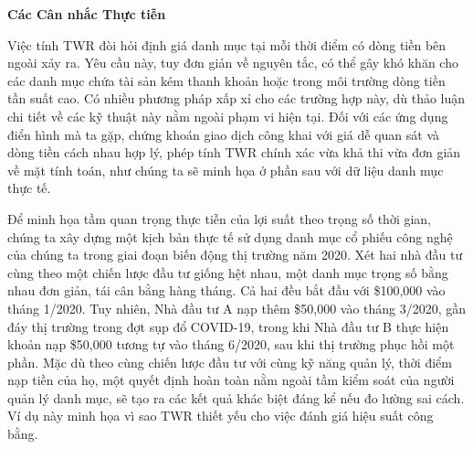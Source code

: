 \textbf{Các Cân nhắc Thực tiễn}

Việc tính TWR đòi hỏi định giá danh mục tại mỗi thời điểm có dòng tiền bên ngoài xảy ra. Yêu cầu này, tuy đơn giản về nguyên tắc, có thể gây khó khăn cho các danh mục chứa tài sản kém thanh khoản hoặc trong môi trường dòng tiền tần suất cao. Có nhiều phương pháp xấp xỉ cho các trường hợp này, dù thảo luận chi tiết về các kỹ thuật này nằm ngoài phạm vi hiện tại. Đối với các ứng dụng điển hình mà ta gặp, chứng khoán giao dịch công khai với giá dễ quan sát và dòng tiền cách nhau hợp lý, phép tính TWR chính xác vừa khả thi vừa đơn giản về mặt tính toán, như chúng ta sẽ minh họa ở phần sau với dữ liệu danh mục thực tế.

Để minh họa tầm quan trọng thực tiễn của lợi suất theo trọng số thời gian, chúng ta xây dựng một kịch bản thực tế sử dụng danh mục cổ phiếu công nghệ của chúng ta trong giai đoạn biến động thị trường năm 2020. Xét hai nhà đầu tư cùng theo một chiến lược đầu tư giống hệt nhau, một danh mục trọng số bằng nhau đơn giản, tái cân bằng hàng tháng. Cả hai đều bắt đầu với \$100,000 vào tháng 1/2020. Tuy nhiên, Nhà đầu tư A nạp thêm \$50,000 vào tháng 3/2020, gần đáy thị trường trong đợt sụp đổ COVID-19, trong khi Nhà đầu tư B thực hiện khoản nạp \$50,000 tương tự vào tháng 6/2020, sau khi thị trường phục hồi một phần. Mặc dù theo cùng chiến lược đầu tư với cùng kỹ năng quản lý, thời điểm nạp tiền của họ, một quyết định hoàn toàn nằm ngoài tầm kiểm soát của người quản lý danh mục, sẽ tạo ra các kết quả khác biệt đáng kể nếu đo lường sai cách. Ví dụ này minh họa vì sao TWR thiết yếu cho việc đánh giá hiệu suất công bằng.

